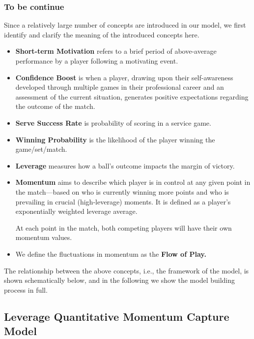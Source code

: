 \documentclass{mcmthesis}
\begin{document}
\subsubsection{To be continue}
Since a relatively large number of concepts are introduced in our model, we first identify
and clarify the meaning of the introduced concepts here.
\begin{itemize}
  \item \textbf{Short-term Motivation} refers to a brief period of above-average performance by a player
  following a motivating event.
  \item \textbf{Confidence Boost} is when a player, drawing upon their self-awareness developed through
  multiple games in their professional career and an assessment of the current situation,
  generates positive expectations regarding the outcome of the match.
  \item \textbf{Serve Success Rate} is probability of scoring in a service game.
  \item \textbf{Winning Probability} is the likelihood of the player winning the game/set/match.
  \item \textbf{Leverage} measures how a ball’s outcome impacts the margin of victory.
  \item \textbf{Momentum} aims to describe which player is in control at any given point in the
  match—based on who is currently winning more points and who is prevailing in crucial
  (high-leverage) moments. It is defined as a player’s exponentially weighted leverage
  average.\par
  At each point in the match, both competing players will have their own momentum values.
  \item We define the fluctuations in momentum as the \textbf{Flow of Play.}
\end{itemize}
The relationship between the above concepts, i.e., the framework of the model, 
is shown schematically below, and in the following we show the model building process in full.
\subsection{Leverage Quantitative Momentum Capture Model}
\end{document}
